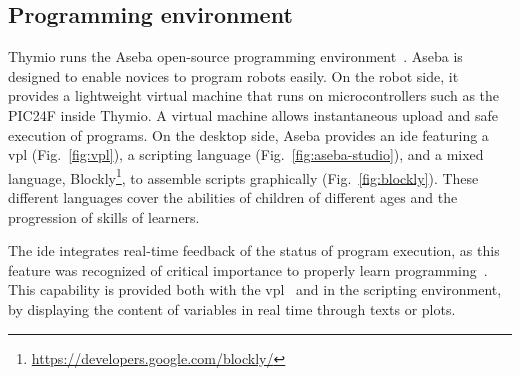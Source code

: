 \documentclass[letterpaper, 10 pt, conference]{ieeeconf}  %
\begin{document}
\subsection{Programming environment}
\label{sec:aseba}

Thymio runs the Aseba open-source programming environment~\cite{aseba}.
Aseba is designed to enable novices to program robots easily.
On the robot side, it provides a lightweight virtual machine that runs on microcontrollers such as the PIC24F inside Thymio.
A virtual machine allows instantaneous upload and safe execution of programs.
On the desktop side, Aseba provides an \ac{ide} featuring a \ac{vpl} (Fig.~\ref{fig:vpl}), a scripting language (Fig.~\ref{fig:aseba-studio}), and a mixed language, Blockly\footnote{\url{https://developers.google.com/blockly/}}, to assemble scripts graphically (Fig.~\ref{fig:blockly}).
These different languages cover the abilities of children of different ages and the progression of skills of learners.


The \ac{ide} integrates real-time feedback of the status of program execution, as this feature was recognized of critical importance to properly learn programming~\cite{sorva2013notional}.
This capability is provided both with the \ac{vpl}~\cite{Magnenat2015} and in the scripting environment, by displaying the content of variables in real time through texts or plots.
\end{document}
